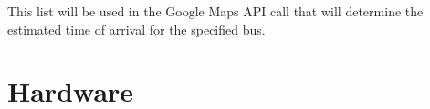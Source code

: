 \documentclass[pageno]{jpaper}
\begin{document}
This list will be used in the Google Maps API call that will 
determine the estimated time of arrival for the specified bus.

\section{Hardware}



\end{document}
